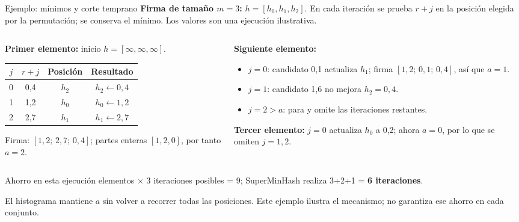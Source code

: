 \documentclass[aspectratio=169,11pt]{beamer}
\begin{document}
\begin{frame}{Ejemplo: mínimos y corte temprano}
  \footnotesize
  \textbf{Firma de tamaño $m=3$:} $h=[h_0,h_1,h_2]$. En cada iteración se
  prueba $r+j$ en la posición elegida por la permutación; se conserva el mínimo.
  Los valores son una ejecución ilustrativa.

  \begin{columns}[T]
    \begin{column}{0.49\textwidth}
      \textbf{Primer elemento:} inicio $h=[\infty,\infty,\infty]$.
      \vspace{0.3em}

      \begin{tabular}{cccc}
        \toprule
        $j$ & $r+j$ & Posición & Resultado \\
        \midrule
        0 & 0,4 & $h_2$ & $h_2\gets0,4$ \\
        1 & 1,2 & $h_0$ & $h_0\gets1,2$ \\
        2 & 2,7 & $h_1$ & $h_1\gets2,7$ \\
        \bottomrule
      \end{tabular}

      \vspace{0.3em}
      Firma: $[1,2;\,2,7;\,0,4]$; partes enteras $[1,2,0]$,
      por tanto $a=2$.
    \end{column}
    \begin{column}{0.49\textwidth}
      \textbf{Siguiente elemento:}
      \begin{itemize}
        \item $j=0$: candidato 0,1 actualiza $h_1$;
              firma $[1,2;\,0,1;\,0,4]$, así que $a=1$.
        \item $j=1$: candidato 1,6 no mejora $h_2=0,4$.
        \item $j=2>a$: para y omite las iteraciones restantes.
      \end{itemize}
      \vspace{0.2em}
      \textbf{Tercer elemento:} $j=0$ actualiza $h_0$ a 0,2; ahora $a=0$,
      por lo que se omiten $j=1,2$.
    \end{column}
  \end{columns}
  \vfill
  \begin{block}{Ahorro en esta ejecución}
     elementos $\times$ 3 iteraciones posibles = 9;
    SuperMinHash realiza 3+2+1 = \textbf{6 iteraciones}.
  \end{block}
  \scriptsize El histograma mantiene $a$ sin volver a recorrer todas las posiciones.
  Este ejemplo ilustra el mecanismo; no garantiza ese ahorro en cada conjunto.
\end{frame}
\end{document}
